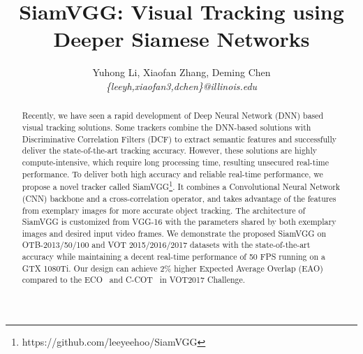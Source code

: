 \documentclass[runningheads]{llncs}
\begin{document}
\pagestyle{plain}
\mainmatter


\title{SiamVGG: Visual Tracking using Deeper Siamese Networks} 



\author{Yuhong Li, Xiaofan Zhang, Deming Chen \\\textit{\{leeyh,xiaofan3,dchen\}@illinois.edu}
}



\maketitle

\begin{abstract}
Recently, we have seen a rapid development of Deep Neural Network (DNN) based visual tracking solutions. Some trackers combine the DNN-based solutions with Discriminative Correlation Filters (DCF) to extract semantic features and successfully deliver the state-of-the-art tracking accuracy. However, these solutions are highly compute-intensive, which require long processing time, resulting unsecured real-time performance. To deliver both high accuracy and reliable real-time performance, we propose a novel tracker called SiamVGG\footnote{https://github.com/leeyeehoo/SiamVGG}. It combines a Convolutional Neural Network (CNN) backbone and a cross-correlation operator, and takes advantage of the features from exemplary images for more accurate object tracking.
The architecture of SiamVGG is customized from VGG-16 with the parameters shared by both exemplary images and desired input video frames. 
We demonstrate the proposed SiamVGG on OTB-2013/50/100 and VOT 2015/2016/2017 datasets with the state-of-the-art accuracy while maintaining a decent real-time performance of 50 FPS running on a GTX 1080Ti. Our design can achieve 2\% higher Expected Average Overlap (EAO) compared to the ECO~\cite{danelljan2017eco} and  C-COT~\cite{danelljan2015convolutional} in VOT2017 Challenge.

\end{abstract}
\end{document}

